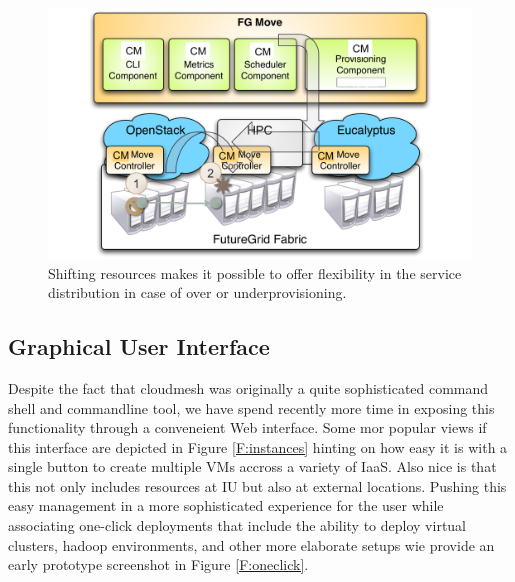 \documentclass{article}
\begin{document}
\begin{figure}[h!]
  \centering
    \includegraphics[width=1.0\textwidth]{images/shift2.pdf}
  \caption{Shifting resources makes it possible to offer flexibility
    in the service distribution in case of over or underprovisioning.}\label{F:shift}
\end{figure}

\subsection{Graphical User Interface}

Despite the fact that cloudmesh was originally a quite sophisticated
command shell and commandline tool, we have spend recently more time
in exposing this functionality through a conveneient Web
interface. Some mor popular views if this interface are depicted in
Figure \ref{F:instances} hinting on how easy it is with a single
button to create multiple VMs accross a variety of IaaS. Also nice is
that this not only includes resources at IU but also at external
locations. Pushing this easy management in a more sophisticated
experience for the user while associating one-click deployments that
include the ability to deploy virtual clusters, hadoop environments,
and other more elaborate setups wie provide an early prototype
screenshot in Figure \ref{F:oneclick}.
\end{document}
